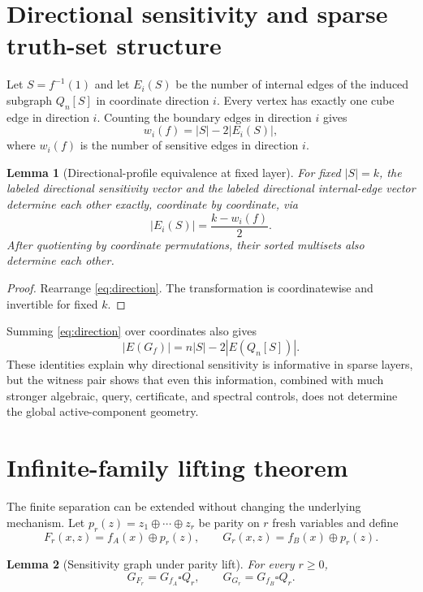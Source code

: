 \documentclass[twoside,12pt,letterpaper]{article}
\newtheorem{lemma}{Lemma}
\theoremstyle{definition}
\begin{document}
\section{Directional sensitivity and sparse truth-set structure}
Let $S=f^{-1}(1)$ and let $E_i(S)$ be the number of internal edges of the induced subgraph $Q_n[S]$ in coordinate direction $i$. Every vertex has exactly one cube edge in direction $i$. Counting the boundary edges in direction $i$ gives
\begin{equation}
 w_i(f)=|S|-2|E_i(S)|,
 \label{eq:direction}
\end{equation}
where $w_i(f)$ is the number of sensitive edges in direction $i$.

\begin{lemma}[Directional-profile equivalence at fixed layer]
For fixed $|S|=k$, the labeled directional sensitivity vector and the labeled directional internal-edge vector determine each other exactly, coordinate by coordinate, via
\[
|E_i(S)|=\frac{k-w_i(f)}{2}.
\]
After quotienting by coordinate permutations, their sorted multisets also determine each other.
\end{lemma}

\begin{proof}
Rearrange \cref{eq:direction}. The transformation is coordinatewise and invertible for fixed $k$.
\end{proof}

Summing \cref{eq:direction} over coordinates also gives
\[
|E(G_f)|=n|S|-2|E(Q_n[S])|.
\]
These identities explain why directional sensitivity is informative in sparse layers, but the witness pair shows that even this information, combined with much stronger algebraic, query, certificate, and spectral controls, does not determine the global active-component geometry.

\section{Infinite-family lifting theorem}
The finite separation can be extended without changing the underlying mechanism. Let $p_r(z)=z_1\oplus\cdots\oplus z_r$ be parity on $r$ fresh variables and define
\[
F_r(x,z)=f_A(x)\oplus p_r(z),\qquad
G_r(x,z)=f_B(x)\oplus p_r(z).
\]

\begin{lemma}[Sensitivity graph under parity lift]
For every $r\ge0$,
\[
G_{F_r}=G_{f_A}\square Q_r,
\qquad
G_{G_r}=G_{f_B}\square Q_r.
\]
\end{lemma}
\end{document}
